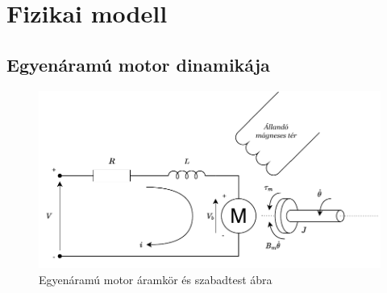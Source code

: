 \chapter{Fizikai modell}\label{chap:physical_system}

\section{Egyenáramú motor dinamikája}

\begin{figure}[b!]
\begin{center}
\includegraphics[width=\textwidth]{images/dc_motor_model.pdf}
\caption{Egyenáramú motor áramkör és szabadtest ábra}
\label{fig:dc_motor}
\end{center}
\end{figure}

